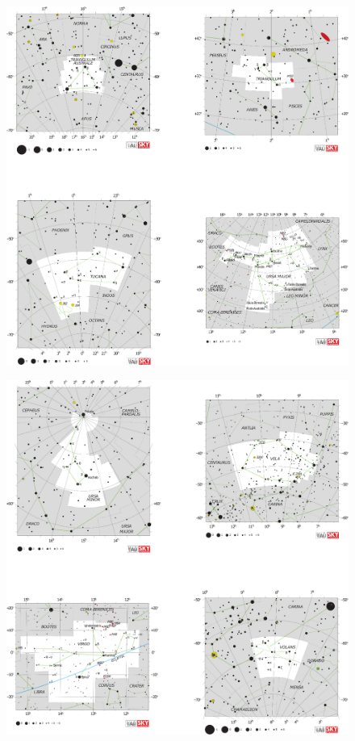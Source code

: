 \documentclass[a4paper,12pt]{extarticle}
\begin{document}
\clearpage
\begin{figure}
	\centering
	\includegraphics[width=\linewidth]{C21.eps}
\end{figure}
\clearpage
\begin{figure}
	\centering
	\includegraphics[width=\linewidth]{C22.eps}
\end{figure}
\end{document}
